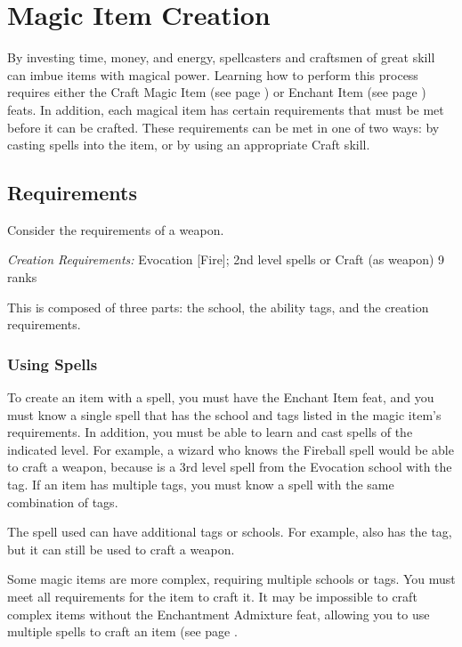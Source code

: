\section{Magic Item Creation}\label{Magic Item Creation}\label{Creating Magic Items}

    By investing time, money, and energy, spellcasters and craftsmen of great skill can imbue items with magical power. Learning how to perform this process requires either the Craft Magic Item (see page ) or Enchant Item (see page ) feats. In addition, each magical item has certain requirements that must be met before it can be crafted. These requirements can be met in one of two ways: by casting spells into the item, or by using an appropriate Craft skill.

\subsection{Requirements}
Consider the requirements of a  weapon.

\textit{Creation Requirements:} Evocation [Fire]; 2nd level spells or Craft (as weapon) 9 ranks

This is composed of three parts: the school, the ability tags, and the creation requirements.

\subsubsection{Using Spells}
    To create an item with a spell, you must have the Enchant Item feat, and you must know a single spell that has the school and tags listed in the magic item's requirements. In addition, you must be able to learn and cast spells of the indicated level. For example, a wizard who knows the Fireball spell would be able to craft a  weapon, because  is a 3rd level spell from the Evocation school with the  tag. If an item has multiple tags, you must know a spell with the same combination of tags.
    
    The spell used can have additional tags or schools. For example,  also has the  tag, but it can still be used to craft a  weapon.

    Some magic items are more complex, requiring multiple schools or tags. You must meet all requirements for the item to craft it. It may be impossible to craft complex items without the Enchantment Admixture feat, allowing you to use multiple spells to craft an item (see page .

